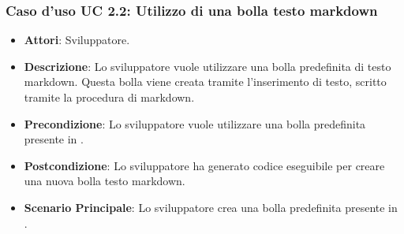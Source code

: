 \subsubsection{Caso d'uso UC 2.2: Utilizzo di una bolla testo markdown}

\FloatBarrier
\begin{itemize}
\item\textbf{Attori}: Sviluppatore.
\item\textbf{Descrizione}: Lo sviluppatore vuole utilizzare una bolla predefinita di testo markdown. Questa bolla viene creata tramite l'inserimento di testo, scritto tramite la procedura di markdown.
\item\textbf{Precondizione}: Lo sviluppatore vuole utilizzare una bolla predefinita presente in \progetto.
\item\textbf{Postcondizione}: Lo sviluppatore ha generato codice eseguibile per creare una nuova bolla testo markdown.
\item\textbf{Scenario Principale}: Lo sviluppatore crea una bolla predefinita presente in \progetto.
\end{itemize}